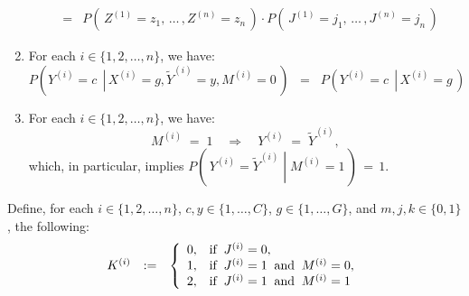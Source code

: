 \begin{theorem}
\begin{enumerate}
\begin{eqnarray*}
	\\
	& = &
		P\!\left(\,Z^{(1)}=z_{1},\,\ldots\,,Z^{(n)}=z_{n}\,\right)
		\cdot
		P\!\left(\,J^{(1)}=j_{1},\,\ldots\,,J^{(n)}=j_{n}\,\right)
	\end{eqnarray*}
\item\label{MzeroImplies}
	For each $i\in\{1,2,\ldots,n\}$, we have:
	\begin{equation*}
	P\!\left(\left.Y^{(i)} = c\,\;\right\vert\,X^{(i)}=g,\widetilde{Y}^{(i)}=y,M^{(i)}=0\,\right)
	\;\; = \;\;
	P\!\left(\left.Y^{(i)} = c\,\;\right\vert\,X^{(i)}=g\,\right)
	\end{equation*}
\item\label{MoneImpliesCEqualsY}
	For each $i\in\{1,2,\ldots,n\}$, we have:
	\begin{equation*}
	M^{(i)} \; = \; 1
	\quad\Longrightarrow\quad
	Y^{(i)} \; = \; \widetilde{Y}^{(i)},
	\end{equation*}
	which, in particular, implies $P\!\left(\,\left.Y^{(i)} = \widetilde{Y}^{(i)}\;\right\vert\;M^{(i)}=1\,\right)\,=\,1$.
\end{enumerate}
\renewcommand{\theenumi}{\roman{enumi}}
\renewcommand{\labelenumi}{\textnormal{(\theenumi)}$\;\;$}
Define, for each
\;$i \in \{1,2,\ldots,n\}$,
\;$c,y \in \{1,\ldots,C\}$,
\;$g \in \{1,\ldots,G\}$,
\;and
\;$m,j,k \in \{0,1\}$,
\;the following:
\begin{equation*}
\begin{array}{ccll}
	K^{(i)}
		&:=&
		\left\{\begin{array}{cl}
		0, & \textnormal{if}\;\; J^{(i)} = 0,
		\\
		1, & \textnormal{if}\;\; J^{(i)} = 1 \;\;\textnormal{and}\;\; M^{(i)} = 0,
		\\
		2, & \textnormal{if}\;\; J^{(i)} = 1 \;\;\textnormal{and}\;\; M^{(i)} = 1
		\end{array}\right.
	\\

\end{array}
\end{equation*}
\end{theorem}
